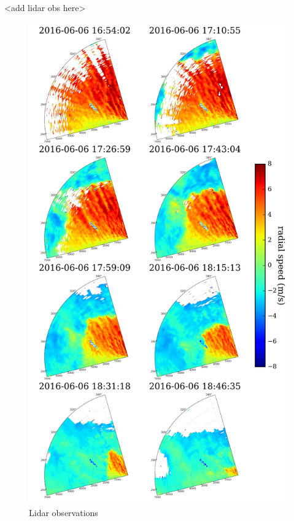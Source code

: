 <add lidar obs here>


\begin{figure}[htbp]
    \centering
        \includegraphics[width=1.0\textwidth, height=1.0\textheight, keepaspectratio]{graphics/results/balcony-addendum/lidar_front_ppis_8up.png}
    \caption{Lidar observations}
    \label{fig:lidar_front_ppis_8up}
\end{figure}


